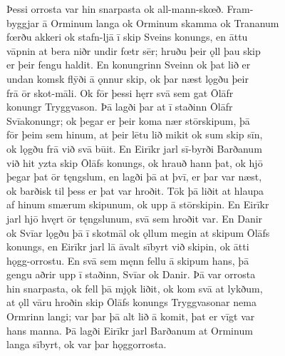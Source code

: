\documentclass[12pt,letterpaper]{book}
\begin{document}
\begin{linenumbers}
Þessi orrosta var hin snarpasta ok all-mann-skœð.  Fram-\\
byggjar ā Orminum langa ok Orminum skamma ok Trananum\\
fœrðu akkeri ok stafn-ljā ī skip Sveins konungs, en āttu\\
vāpnin at bera niðr undir fœtr sēr; hruðu þeir ǫll þau skip\\
er þeir fengu haldit.  En konungrinn Sveinn ok þat lið er\\
undan komsk flȳði ā ǫnnur skip, ok þar næst lǫgðu þeir\\
frā ōr skot-māli.  Ok fōr þessi hęrr svā sem gat Ōlāfr\\
konungr Tryggvason.  Þā lagði þar at ī staðinn Ōlāfr\\
Svīakonungr; ok þegar er þeir koma nær stōrskipum, þā\\
fōr þeim sem hinum, at þeir lētu lið mikit ok sum skip sīn,\\
ok lǫgðu frā við svā būit.  En Eirīkr jarl sī-byrði Barðanum\\
við hit yzta skip Ōlāfs konungs, ok hrauð hann þat, ok hjō\\
þegar þat ōr tęngslum, en lagði þā at þvī, er þar var næst,\\
ok barðisk til þess er þat var hroðit.  Tōk þā liðit at hlaupa\\
af hinum smærum skipunum, ok upp ā stōrskipin.  En Eirīkr\\
jarl hjō hvęrt ōr tęngslunum, svā sem hroðit var.  En Danir\\
ok Svīar lǫgðu þā ī skotmāl ok ǫllum megin at skipum Ōlāfs\\
konungs, en Eirīkr jarl lā āvalt sībyrt við skipin, ok ātti\\
hǫgg-orrostu.  En svā sem męnn fellu ā skipum hans, þā\\
gengu aðrir upp ī staðinn, Svīar ok Danir.  Þā var orrosta\\
hin snarpasta, ok fell þā mjǫk liðit, ok kom svā at lykðum,\\
at ǫll vāru hroðin skip Ōlāfs konungs Tryggvasonar nema\\
Ormrinn langi; var þar þā alt lið ā komit, þat er vīgt var\\
hans manna.  Þā lagði Eirīkr jarl Barðanum at Orminum\\
langa sībyrt, ok var þar hǫggorrosta.


\end{linenumbers}
\end{document}
